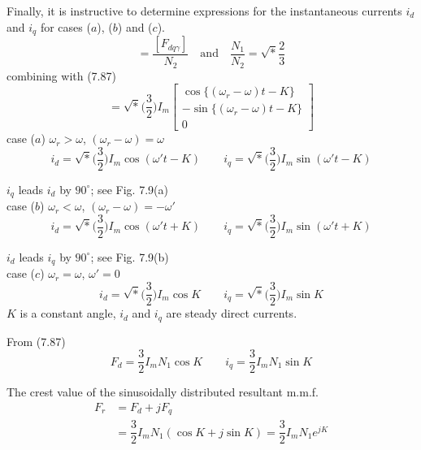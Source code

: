 \documentclass[a4paper,numbers=noenddot,12pt]{scrbook}
\begin{document}
    Finally, it is instructive to determine expressions for the instantaneous currents $i_d$ and $i_q$ for cases ($a$), ($b$) and ($c$).
    \begin{equation*}
        [i_{d q \gamma}] = \dfrac{[F_{d q \gamma}]}{N_2} \quad \text{and} \quad \dfrac{N_1}{N_2} = \sqrt*{\dfrac{2}{3}}
    \end{equation*}
combining with (7.87)
\begin{equation}
    [i_{d q \gamma}] = \sqrt*{\Big( \dfrac{3}{2} \Big)} I_m
    \begin{bmatrix}
        \cos \{(\omega_r - \omega)t -K\} \\
        -\sin \{(\omega_r - \omega)t -K\} \\
        0
    \end{bmatrix}
    \label{eq:Eq7.93}
\end{equation}
case ($a$) $\omega_r > \omega$, $(\omega_r - \omega) = \omega$
\begin{equation*}
    i_d = \sqrt*{\Big( \dfrac{3}{2} \Big)} I_m \cos (\omega' t - K) \qquad i_q = \sqrt*{\Big( \dfrac{3}{2} \Big)} I_m \sin (\omega' t - K)
\end{equation*}

$i_q$ leads $i_d$ by $90^{\circ}$; see Fig. 7.9(a) \\
case ($b$) $\omega_r < \omega$, $(\omega_r - \omega) = -\omega'$
\begin{equation*}
    i_d = \sqrt*{\Big( \dfrac{3}{2} \Big)} I_m \cos (\omega' t + K) \qquad i_q = \sqrt*{\Big( \dfrac{3}{2} \Big)} I_m \sin (\omega' t + K)
\end{equation*}

$i_d$ leads $i_q$ by $90^{\circ}$; see Fig. 7.9(b) \\
case ($c$) $\omega_r = \omega$, $\omega' = 0$
\begin{equation*}
    i_d = \sqrt*{\Big( \dfrac{3}{2} \Big)} I_m \cos K \qquad i_q = \sqrt*{\Big( \dfrac{3}{2} \Big)} I_m \sin K
\end{equation*}
$K$ is a constant angle, $i_d$ and $i_q$ are steady direct currents.

From (7.87)
\begin{equation*}
    F_d = \dfrac{3}{2} I_m N_1 \cos K \qquad i_q = \dfrac{3}{2} I_m N_1 \sin K
\end{equation*}

The crest value of the sinusoidally distributed resultant m.m.f.
\begin{align*}
    F_r & = F_d + jF_q\\
    & = \dfrac{3}{2} I_m N_1 (\cos K + j \sin K) = \dfrac{3}{2} I_m N_1 e^{jK}
\end{align*}
\end{document}

